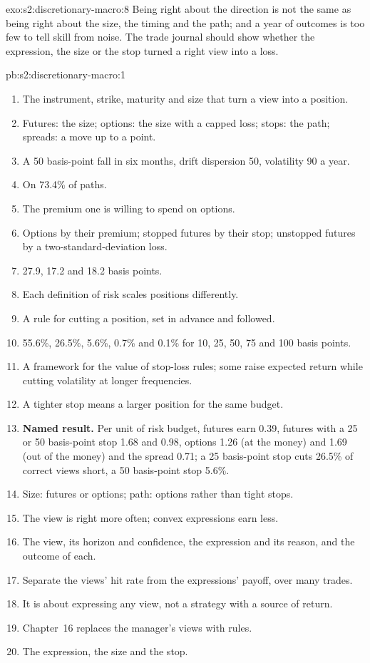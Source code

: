 \begin{solution}{exo:s2:discretionary-macro:8}
Being right about the direction is not the same as being right about the size, the timing and the path; and a year of outcomes is too few to tell skill
from noise. The trade journal should show whether the expression, the size or the stop turned a right view into a loss.
\end{solution}

\begin{solution}{pb:s2:discretionary-macro:1}
\begin{enumerate}
\item The instrument, strike, maturity and size that turn a view into a position.
\item Futures: the size; options: the size with a capped loss; stops: the path; spreads: a move up to a point.
\item A 50 basis-point fall in six months, drift dispersion 50, volatility 90 a year.
\item On 73.4\% of paths.
\item The premium one is willing to spend on options.
\item Options by their premium; stopped futures by their stop; unstopped futures by a two-standard-deviation loss.
\item 27.9, 17.2 and 18.2 basis points.
\item Each definition of risk scales positions differently.
\item A rule for cutting a position, set in advance and followed.
\item 55.6\%, 26.5\%, 5.6\%, 0.7\% and 0.1\% for 10, 25, 50, 75 and 100 basis points.
\item A framework for the value of stop-loss rules; some raise expected return while cutting volatility at longer frequencies.
\item A tighter stop means a larger position for the same budget.
\item \textbf{Named result.} Per unit of risk budget, futures earn 0.39, futures with a 25 or 50 basis-point stop 1.68 and 0.98, options 1.26 (at the
money) and 1.69 (out of the money) and the spread 0.71; a 25 basis-point stop cuts 26.5\% of correct views short, a 50 basis-point stop 5.6\%.
\item Size: futures or options; path: options rather than tight stops.
\item The view is right more often; convex expressions earn less.
\item The view, its horizon and confidence, the expression and its reason, and the outcome of each.
\item Separate the views' hit rate from the expressions' payoff, over many trades.
\item It is about expressing any view, not a strategy with a source of return.
\item Chapter~16 replaces the manager's views with rules.
\item The expression, the size and the stop.
\end{enumerate}
\end{solution}


